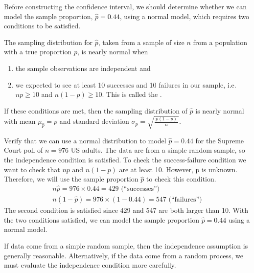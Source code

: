 Before constructing the confidence interval, we should determine whether we can model the sample proportion, $\hat{p} = 0.44$, using a normal model, which requires two conditions to be satisfied.

\begin{termBox}{
The sampling distribution for $\hat{p}$, taken from a sample of size $n$ from a population with a true proportion $p$, is nearly normal when
\begin{enumerate}
\item the sample observations are independent and
\item we expected to see at least 10 successes and 10 failures in our sample, i.e. $np\geq10$ and $n(1-p)\geq10$. This is called the .
\end{enumerate}
If these conditions are met, then the sampling distribution of $\hat{p}$ is nearly normal with mean $\mu_{\hat{p}}=p$ and standard deviation $\sigma_{\hat{p}} = \sqrt{\frac{\ p(1-p)\ }{n}}$.}
\end{termBox}

\begin{example}{Verify that we can use a normal distribution to model $\hat{p}=0.44$ for the Supreme Court poll of $n = 976$ US adults.}
\label{supremeCourtCIConditionsExample}
The data are from a simple random sample, so the independence condition is satisfied. To check the success-failure condition we want to check that $np$ and $n(1-p)$ are at least 10. However, p is unknown. Therefore, we will use the sample proportion $\hat{p}$ to check this condition.
\begin{align*}
n\hat{p} = 976 \times 0.44 = 429\text{ (``successes'')} \\
 n(1-\hat{p}) = 976 \times (1 - 0.44) = 547\text{ (``failures'')}
\end{align*}
The second condition is satisfied since 429 and 547 are both larger than 10. With the two conditions satisfied, we can model the sample proportion $\hat{p} = 0.44$ using a normal model.
\end{example}

\begin{tipBox}{
If data come from a simple random sample, then the independence assumption is generally reasonable. Alternatively, if the data come from a random process, we must evaluate the independence condition more carefully.}
\end{tipBox}

